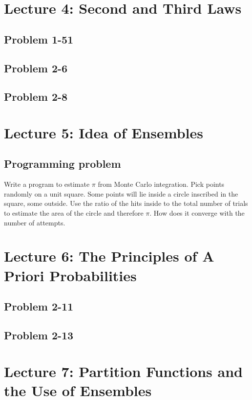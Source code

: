 \documentclass[reprint]{revtex4-1}
\numberwithin{equation}{section}
\begin{document}
\section{Lecture 4: Second and Third Laws}

\subsection{Problem 1-51}

\subsection{Problem 2-6}

\subsection{Problem 2-8}

\section{Lecture 5: Idea of Ensembles}

\subsection{Programming problem}

Write a program to estimate $\pi$ from Monte Carlo integration.
%
Pick points randomly on a unit square.
%
Some points will lie inside a circle inscribed in the square,
some outside.
%
Use the ratio of the hits inside to the total number of trials
to estimate the area of the circle and therefore $\pi$.
How does it converge with the number of attempts.

\section{Lecture 6: The Principles of A Priori Probabilities}

\subsection{Problem 2-11}

\subsection{Problem 2-13}

\section{Lecture 7: Partition Functions and the Use of Ensembles}
\end{document}
